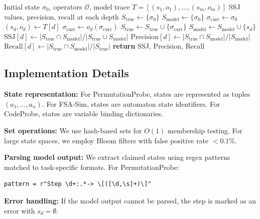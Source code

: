 \documentclass{article}
\theoremstyle{plain}
\theoremstyle{definition}
\theoremstyle{remark}
\begin{document}
\begin{algorithm}[h]
\caption{State-Space Jaccard (SSJ) Extraction}
\label{alg:ssj}
\begin{algorithmic}[1]
\REQUIRE Initial state $\sigma_0$, operators $\mathcal{O}$, model trace $T = [(s_1, o_1), \ldots, (s_m, o_m)]$
\ENSURE SSJ values, precision, recall at each depth
\STATE $S_{\text{true}} \leftarrow \{\sigma_0\}$ 
\STATE $S_{\text{model}} \leftarrow \{\sigma_0\}$ 
\STATE $\sigma_{\text{curr}} \leftarrow \sigma_0$ 
    \STATE $(s_d, o_d) \leftarrow T[d]$ 
    \STATE $\sigma_{\text{curr}} \leftarrow o_d(\sigma_{\text{curr}})$ 
    \STATE $S_{\text{true}} \leftarrow S_{\text{true}} \cup \{\sigma_{\text{curr}}\}$
    \STATE $S_{\text{model}} \leftarrow S_{\text{model}} \cup \{s_d\}$
    \STATE $\text{SSJ}[d] \leftarrow |S_{\text{true}} \cap S_{\text{model}}| / |S_{\text{true}} \cup S_{\text{model}}|$
    \STATE $\text{Precision}[d] \leftarrow |S_{\text{true}} \cap S_{\text{model}}| / |S_{\text{model}}|$
    \STATE $\text{Recall}[d] \leftarrow |S_{\text{true}} \cap S_{\text{model}}| / |S_{\text{true}}|$
\ENDFOR
\STATE \textbf{return} SSJ, Precision, Recall
\end{algorithmic}
\end{algorithm}

\subsection{Implementation Details}

\textbf{State representation:} For PermutationProbe, states are represented as tuples $(a_1, \ldots, a_n)$. For FSA-Sim, states are automaton state identifiers. For CodeProbe, states are variable binding dictionaries.

\textbf{Set operations:} We use hash-based sets for $O(1)$ membership testing. For large state spaces, we employ Bloom filters with false positive rate $< 0.1\%$.

\textbf{Parsing model output:} We extract claimed states using regex patterns matched to task-specific formats. For PermutationProbe:
\begin{verbatim}
pattern = r"Step \d+:.*-> \[([\d,\s]+)\]"
\end{verbatim}

\textbf{Error handling:} If the model output cannot be parsed, the step is marked as an error with $s_d = \emptyset$.
\end{document}
